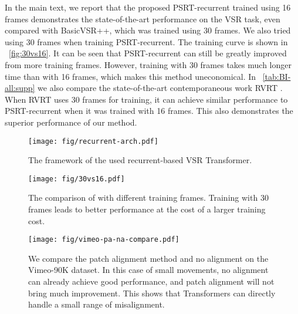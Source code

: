 \documentclass{article}
\begin{document}
In the main text, we report that the proposed PSRT-recurrent trained using 16 frames demonstrates the state-of-the-art performance on the VSR task, even compared with BasicVSR++, which was trained using 30 frames.
We also tried using 30 frames when training PSRT-recurrent.
The training curve is shown in \figurename~\ref{fig:30vs16}.
It can be seen that PSRT-recurrent can still be greatly improved from more training frames.
However, training with 30 frames takes much longer time than with 16 frames, which makes this method uneconomical.
In \tablename~\ref{tab:BI-all:supp} we also compare the state-of-the-art contemporaneous work RVRT \cite{liang2022recurrent}.
When RVRT uses 30 frames for training, it can achieve similar performance to PSRT-recurrent when it was trained with 16 frames.
This also demonstrates the superior performance of our method.


\begin{figure}[t]
\centering
\texttt{[image: fig/recurrent-arch.pdf]}
\vspace{-4mm}
\caption{The framework of the used recurrent-based VSR Transformer.}
\label{fig:re-vsr-t}
\vspace{-4mm}
\end{figure}



\begin{figure}[t]
\begin{minipage}[t]{0.325\textwidth}
    \centering
    \texttt{[image: fig/30vs16.pdf]}
    \vspace{-4mm}
    \caption{The comparison of with different training frames. Training with 30 frames leads to better performance at the cost of a larger training cost.}
    \label{fig:30vs16}
\end{minipage}
\hfill
\begin{minipage}[t]{0.65\textwidth}
\centering
    \texttt{[image: fig/vimeo-pa-na-compare.pdf]}
    \vspace{-4mm}
    \caption{We compare the patch alignment method and no alignment on the Vimeo-90K dataset. In this case of small movements, no alignment can already achieve good performance, and patch alignment will not bring much improvement. This shows that Transformers can directly handle a small range of misalignment.}
    \label{fig:vimeo-pa-na-compare}
\end{minipage}
\vspace{-8mm}
\end{figure}
\end{document}
